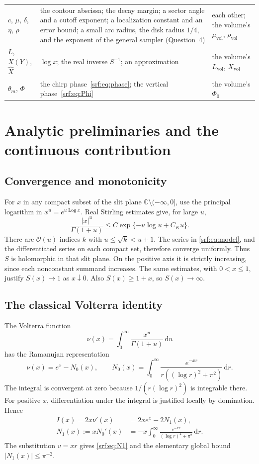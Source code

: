 \documentclass[11pt]{article}
\theoremstyle{remark}\newtheorem{remark}[theorem]{Remark}
\newcommand{\OO}{\mathcal O}
\newcommand{\C}{\mathbb C}
\newcommand{\dd}{\,\mathrm d}
\DeclareMathOperator{\Log}{Log}
\begin{document}
\begin{longtable}{@{}>{\raggedright\arraybackslash}p{0.95in}>{\raggedright\arraybackslash}p{3.3in}>{\raggedright\arraybackslash}p{1.85in}@{}}
$c$, $\mu$, $\delta$, $\eta$, $\rho$ & the contour abscissa; the decay margin; a sector angle and a cutoff exponent; a localization constant and an error bound; a small arc radius, the disk radius $1/4$, and the exponent of the general sampler (Question~4) & each other; the volume's $\mu_{\mathrm{vol}}$, $\rho_{\mathrm{vol}}$\\
$L$, $X(Y)$, $\widehat X$ & $\log x$; the real inverse $S^{-1}$; an approximation & the volume's $L_{\mathrm{vol}}$, $X_{\mathrm{vol}}$\\
$\theta_m$, $\Phi$ & the chirp phase~\eqref{srf:eq:phase}; the vertical phase~\eqref{srf:eq:Phi} & the volume's $\Phi_0$\\
\bottomrule
\end{longtable}
\endgroup

\section{Analytic preliminaries and the continuous contribution}\label{srf:sec:prelim}
\subsection{Convergence and monotonicity}
For $x$ in any compact subset of the slit plane $\C\setminus(-\infty,0]$, use the principal logarithm in $x^u=e^{u\Log x}$. Real Stirling estimates give, for large $u$,
\[
 \frac{|x|^u}{\Gamma(1+u)}
 \le C\exp\{-u\log u+C_Ku\}.
\]
There are $\OO(u)$ indices $k$ with $u\le\sqrt k<u+1$. The series in \eqref{srf:eq:model}, and the differentiated series on each compact set, therefore converge uniformly. Thus $S$ is holomorphic in that slit plane. On the positive axis it is strictly increasing, since each nonconstant summand increases. The same estimates, with $0<x\le1$, justify $S(x)\to1$ as $x\downarrow0$. Also $S(x)\ge1+x$, so $S(x)\to\infty$.

\subsection{The classical Volterra identity}
The Volterra function
\[
 \nu(x)=\int_0^\infty\frac{x^u}{\Gamma(1+u)}\dd u
\]
has the Ramanujan representation \cite[Theorem 3.1]{gm}
\begin{equation}\label{srf:eq:ramanujan}
 \nu(x)=e^x-N_0(x),\qquad
 N_0(x)=\int_0^\infty
 \frac{e^{-xr}}{r((\log r)^2+\pi^2)}\dd r.
\end{equation}
The integral is convergent at zero because $1/(r(\log r)^2)$ is integrable there. For positive $x$, differentiation under the integral is justified locally by domination. Hence
\begin{align}
 I(x)=2x\nu'(x)&=2xe^x-2N_1(x),\label{srf:eq:continuous}\\
 N_1(x):=xN_0'(x)&=-x\int_0^\infty
                 \frac{e^{-xr}}{(\log r)^2+\pi^2}\dd r.
\end{align}
The substitution $v=xr$ gives \eqref{srf:eq:N1} and the elementary global bound $|N_1(x)|\le\pi^{-2}$.
\end{document}
